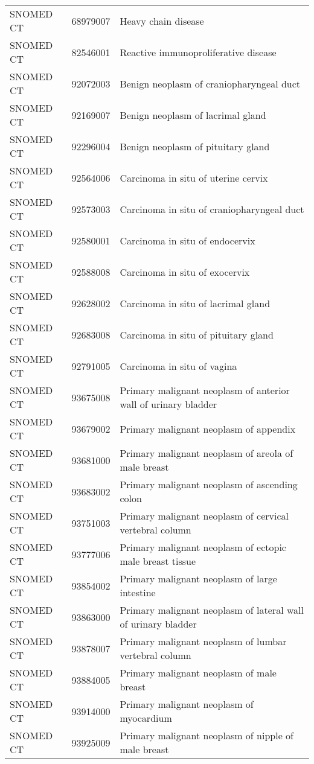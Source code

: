 \begin{longtable}{p{}p{}p{}}
  SNOMED CT & 68979007 & Heavy chain disease \\ 
  SNOMED CT & 82546001 & Reactive immunoproliferative disease \\ 
  SNOMED CT & 92072003 & Benign neoplasm of craniopharyngeal duct \\ 
  SNOMED CT & 92169007 & Benign neoplasm of lacrimal gland \\ 
  SNOMED CT & 92296004 & Benign neoplasm of pituitary gland \\ 
  SNOMED CT & 92564006 & Carcinoma in situ of uterine cervix \\ 
  SNOMED CT & 92573003 & Carcinoma in situ of craniopharyngeal duct \\ 
  SNOMED CT & 92580001 & Carcinoma in situ of endocervix \\ 
  SNOMED CT & 92588008 & Carcinoma in situ of exocervix \\ 
  SNOMED CT & 92628002 & Carcinoma in situ of lacrimal gland \\ 
  SNOMED CT & 92683008 & Carcinoma in situ of pituitary gland \\ 
  SNOMED CT & 92791005 & Carcinoma in situ of vagina \\ 
  SNOMED CT & 93675008 & Primary malignant neoplasm of anterior wall of urinary bladder \\ 
  SNOMED CT & 93679002 & Primary malignant neoplasm of appendix \\ 
  SNOMED CT & 93681000 & Primary malignant neoplasm of areola of male breast \\ 
  SNOMED CT & 93683002 & Primary malignant neoplasm of ascending colon \\ 
  SNOMED CT & 93751003 & Primary malignant neoplasm of cervical vertebral column \\ 
  SNOMED CT & 93777006 & Primary malignant neoplasm of ectopic male breast tissue \\ 
  SNOMED CT & 93854002 & Primary malignant neoplasm of large intestine \\ 
  SNOMED CT & 93863000 & Primary malignant neoplasm of lateral wall of urinary bladder \\ 
  SNOMED CT & 93878007 & Primary malignant neoplasm of lumbar vertebral column \\ 
  SNOMED CT & 93884005 & Primary malignant neoplasm of male breast \\ 
  SNOMED CT & 93914000 & Primary malignant neoplasm of myocardium \\ 
  SNOMED CT & 93925009 & Primary malignant neoplasm of nipple of male breast \\ 

\end{longtable}
